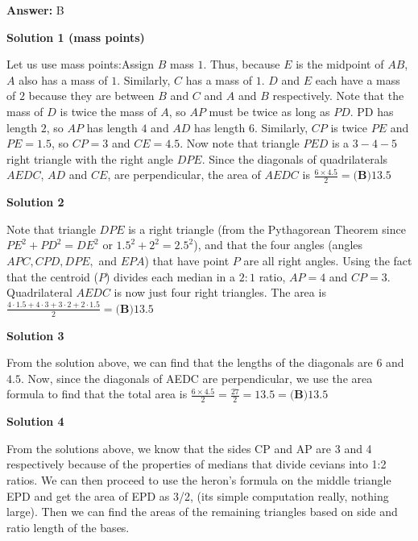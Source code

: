 \begin{enumerate}
 \textbf{Answer: }B



\textbf{Solution 1  (mass points)}

Let us use mass points:Assign $B$ mass $1$.  Thus, because $E$ is the midpoint of $AB$, $A$ also has a mass of $1$.  Similarly, $C$ has a mass of $1$.  $D$ and $E$ each have a mass of $2$ because they are between $B$ and $C$ and $A$ and $B$ respectively.  Note that the mass of $D$ is twice the mass of $A$, so $AP$ must be twice as long as $PD$.  PD has length $2$, so $AP$ has length $4$ and $AD$ has length $6$.  Similarly, $CP$ is twice $PE$ and $PE=1.5$, so $CP=3$ and $CE=4.5$.  Now note that triangle $PED$ is a $3-4-5$ right triangle with the right angle $DPE$. Since the diagonals of quadrilaterals $AEDC$, $AD$ and $CE$, are perpendicular, the area of $AEDC$ is $\frac{6 \times 4.5}{2}=\boxed{\textbf{(B)} 13.5}$




\textbf{Solution 2}

Note that triangle $DPE$ is a right triangle (from the Pythagorean Theorem since $PE^2+PD^2=DE^2$ or $1.5^2+2^2=2.5^2$), and that the four angles (angles $APC, CPD, DPE,$ and $EPA$) that have point $P$ are all right angles. Using the fact that the centroid ($P$) divides each median in a $2:1$ ratio, $AP=4$ and $CP=3$. Quadrilateral $AEDC$ is now just four right triangles. The area is $\frac{4\cdot 1.5+4\cdot 3+3\cdot 2+2\cdot 1.5}{2}=\boxed{\textbf{(B)} 13.5}$




\textbf{Solution 3}

From the solution above, we can find that the lengths of the diagonals are $6$ and $4.5$. Now, since the diagonals of AEDC are perpendicular, we use the area formula to find that the total area is $\frac{6\times4.5}{2} = \frac{27}{2} = 13.5 = \boxed{\textbf{(B)} 13.5}$




\textbf{Solution 4}

From the solutions above, we know that the sides CP and AP are 3 and 4 respectively because of the properties of medians that divide cevians into 1:2 ratios. We can then proceed to use the heron's formula on the middle triangle EPD and get the area of EPD as 3/2, (its simple computation really, nothing large). Then we can find the areas of the remaining triangles based on side and ratio length of the bases.

 




\end{enumerate}
